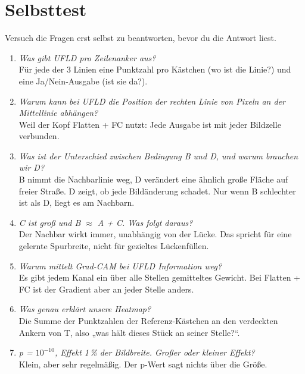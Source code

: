 \documentclass[11pt,a4paper]{article}
\begin{document}
\section{Selbsttest}

Versuch die Fragen erst selbst zu beantworten, bevor du die Antwort liest.

\begin{enumerate}[label=\textbf{\arabic*.}, leftmargin=1.6em]
\item \emph{Was gibt UFLD pro Zeilenanker aus?}\\
  \small Für jede der 3 Linien eine Punktzahl pro Kästchen (wo ist die Linie?) und eine
  Ja/Nein-Ausgabe (ist sie da?).\normalsize

\item \emph{Warum kann bei UFLD die Position der rechten Linie von Pixeln an der Mittellinie
  abhängen?}\\
  \small Weil der Kopf Flatten + FC nutzt: Jede Ausgabe ist mit jeder Bildzelle verbunden.\normalsize

\item \emph{Was ist der Unterschied zwischen Bedingung B und D, und warum brauchen wir D?}\\
  \small B nimmt die Nachbarlinie weg, D verändert eine ähnlich große Fläche auf freier Straße. D
  zeigt, ob jede Bildänderung schadet. Nur wenn B schlechter ist als D, liegt es am Nachbarn.\normalsize

\item \emph{C ist groß und B $\approx$ A + C. Was folgt daraus?}\\
  \small Der Nachbar wirkt immer, unabhängig von der Lücke. Das spricht für eine gelernte
  Spurbreite, nicht für gezieltes Lückenfüllen.\normalsize

\item \emph{Warum mittelt Grad-CAM bei UFLD Information weg?}\\
  \small Es gibt jedem Kanal ein über alle Stellen gemitteltes Gewicht. Bei Flatten + FC ist der
  Gradient aber an jeder Stelle anders.\normalsize

\item \emph{Was genau erklärt unsere Heatmap?}\\
  \small Die Summe der Punktzahlen der Referenz-Kästchen an den verdeckten Ankern von T, also
  „was hält dieses Stück an seiner Stelle?“.\normalsize

\item \emph{p = $10^{-10}$, Effekt 1\,\% der Bildbreite. Großer oder kleiner Effekt?}\\
  \small Klein, aber sehr regelmäßig. Der p-Wert sagt nichts über die Größe.\normalsize


\end{enumerate}
\end{document}
